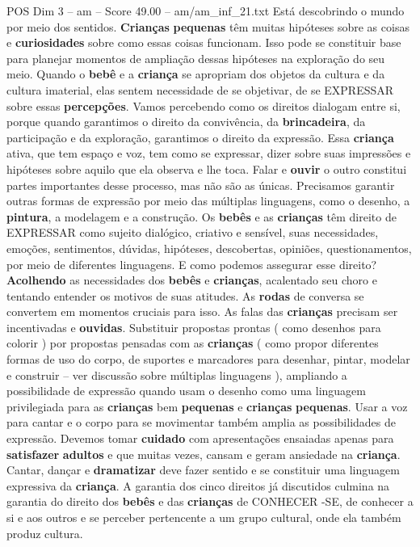 \begin{textsample}{POS Dim 3 – am – Score 49.00 – am/am\_inf\_21.txt}
Está descobrindo o mundo por meio dos sentidos. \textbf{Crianças} \textbf{pequenas} têm muitas hipóteses sobre as coisas e \textbf{curiosidades} sobre como essas coisas funcionam.
Isso pode se constituir base para planejar momentos de ampliação dessas hipóteses na exploração do seu meio.
Quando o \textbf{bebê} e a \textbf{criança} se apropriam dos objetos da cultura e da cultura imaterial, elas sentem necessidade de se objetivar, de se EXPRESSAR sobre essas \textbf{percepções}.
Vamos percebendo como os direitos dialogam entre si, porque quando garantimos o direito da convivência, da \textbf{brincadeira}, da participação e da exploração, garantimos o direito da expressão.
Essa \textbf{criança} ativa, que tem espaço e voz, tem como se expressar, dizer sobre suas impressões e hipóteses sobre aquilo que ela observa e lhe toca.
Falar e \textbf{ouvir} o outro constitui partes importantes desse processo, mas não são as únicas.
Precisamos garantir outras formas de expressão por meio das múltiplas linguagens, como o desenho, a \textbf{pintura}, a modelagem e a construção.
Os \textbf{bebês} e as \textbf{crianças} têm direito de EXPRESSAR como sujeito dialógico, criativo e sensível, suas necessidades, emoções, sentimentos, dúvidas, hipóteses, descobertas, opiniões, questionamentos, por meio de diferentes linguagens.
E como podemos assegurar esse direito? \textbf{Acolhendo} as necessidades dos \textbf{bebês} e \textbf{crianças}, acalentado seu choro e tentando entender os motivos de suas atitudes.
As \textbf{rodas} de conversa se convertem em momentos cruciais para isso.
As falas das \textbf{crianças} precisam ser incentivadas e \textbf{ouvidas}.
Substituir propostas prontas ( como desenhos para colorir ) por propostas pensadas com as \textbf{crianças} ( como propor diferentes formas de uso do corpo, de suportes e marcadores para desenhar, pintar, modelar e construir – ver discussão sobre múltiplas linguagens ), ampliando a possibilidade de expressão quando usam o desenho como uma linguagem privilegiada para as \textbf{crianças} bem \textbf{pequenas} e \textbf{crianças} \textbf{pequenas}.
Usar a voz para cantar e o corpo para se movimentar também amplia as possibilidades de expressão.
Devemos tomar \textbf{cuidado} com apresentações ensaiadas apenas para \textbf{satisfazer} \textbf{adultos} e que muitas vezes, cansam e geram ansiedade na \textbf{criança}.
Cantar, dançar e \textbf{dramatizar} deve fazer sentido e se constituir uma linguagem expressiva da \textbf{criança}.
A garantia dos cinco direitos já discutidos culmina na garantia do direito dos \textbf{bebês} e das \textbf{crianças} de CONHECER -SE, de conhecer a si e aos outros e se perceber pertencente a um grupo cultural, onde ela também produz cultura.

\end{textsample}
